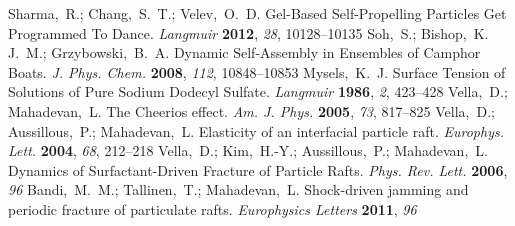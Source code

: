 \documentclass[journal=langd5, manuscript=article, layout=twocolumn]{achemso}
\begin{document}
\begin{mcitethebibliography}{27}
\mciteBstWouldAddEndPuncttrue
\mciteSetBstMidEndSepPunct{\mcitedefaultmidpunct}
{\mcitedefaultendpunct}{\mcitedefaultseppunct}\relax
\EndOfBibitem
{}
Sharma,~R.; Chang,~S.~T.; Velev,~O.~D. Gel-Based Self-Propelling Particles Get
  Programmed To Dance. \emph{Langmuir} \textbf{2012}, \emph{28},
  10128--10135\relax
\mciteBstWouldAddEndPuncttrue
\mciteSetBstMidEndSepPunct{\mcitedefaultmidpunct}
{\mcitedefaultendpunct}{\mcitedefaultseppunct}\relax
\EndOfBibitem
{}
Soh,~S.; Bishop,~K. J.~M.; Grzybowski,~B.~A. Dynamic Self-Assembly in Ensembles
  of Camphor Boats. \emph{J. Phys. Chem.} \textbf{2008}, \emph{112},
  10848--10853\relax
\mciteBstWouldAddEndPuncttrue
\mciteSetBstMidEndSepPunct{\mcitedefaultmidpunct}
{\mcitedefaultendpunct}{\mcitedefaultseppunct}\relax
\EndOfBibitem
{}
Mysels,~K.~J. Surface Tension of Solutions of Pure Sodium Dodecyl Sulfate.
  \emph{Langmuir} \textbf{1986}, \emph{2}, 423--428\relax
\mciteBstWouldAddEndPuncttrue
\mciteSetBstMidEndSepPunct{\mcitedefaultmidpunct}
{\mcitedefaultendpunct}{\mcitedefaultseppunct}\relax
\EndOfBibitem
{}
Vella,~D.; Mahadevan,~L. The Cheerios effect. \emph{Am. J. Phys.}
  \textbf{2005}, \emph{73}, 817--825\relax
\mciteBstWouldAddEndPuncttrue
\mciteSetBstMidEndSepPunct{\mcitedefaultmidpunct}
{\mcitedefaultendpunct}{\mcitedefaultseppunct}\relax
\EndOfBibitem
{}
Vella,~D.; Aussillous,~P.; Mahadevan,~L. Elasticity of an interfacial particle
  raft. \emph{Europhys. Lett.} \textbf{2004}, \emph{68}, 212--218\relax
\mciteBstWouldAddEndPuncttrue
\mciteSetBstMidEndSepPunct{\mcitedefaultmidpunct}
{\mcitedefaultendpunct}{\mcitedefaultseppunct}\relax
\EndOfBibitem
{}
Vella,~D.; Kim,~H.-Y.; Aussillous,~P.; Mahadevan,~L. Dynamics of
  Surfactant-Driven Fracture of Particle Rafts. \emph{Phys. Rev. Lett.}
  \textbf{2006}, \emph{96}\relax
\mciteBstWouldAddEndPuncttrue
\mciteSetBstMidEndSepPunct{\mcitedefaultmidpunct}
{\mcitedefaultendpunct}{\mcitedefaultseppunct}\relax
\EndOfBibitem
{}
Bandi,~M.~M.; Tallinen,~T.; Mahadevan,~L. Shock-driven jamming and periodic
  fracture of particulate rafts. \emph{Europhysics Letters} \textbf{2011},
  \emph{96}\relax
\mciteBstWouldAddEndPuncttrue

\end{mcitethebibliography}
\end{document}
